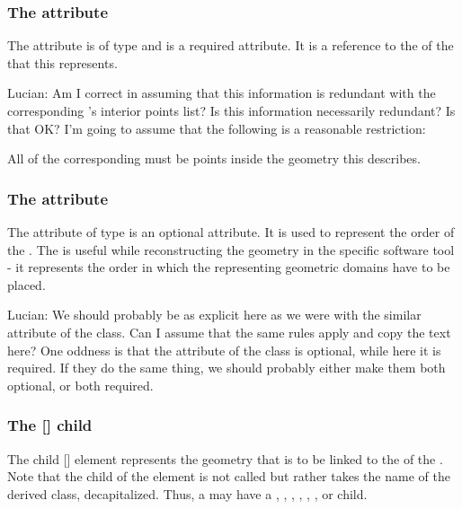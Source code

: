 \subsubsection{The  attribute}
The  attribute is of type  and is a required attribute. It is a reference to the  of the \Domain that this \CSGObject represents.

{\color{red} Lucian: \notice Am I correct in assuming that this information is redundant with the corresponding \Domain's interior points list?  Is this information necessarily redundant?  Is that OK?  I'm going to assume that the following is a reasonable restriction:}

All \InteriorPoints of the corresponding \Domain must be points inside the geometry this \CSGObject describes.

\subsubsection{The  attribute}
The  attribute of type  is an optional attribute. It is used to represent the order of the \CSGObject. The  is useful while reconstructing the geometry in the specific software tool - it represents the order in which the \CSGObjects representing geometric domains have to be placed.

{\color{red} Lucian: \notice We should probably be as explicit here as we were with the similar  attribute of the \AnalyticVolume class.  Can I assume that the same rules apply and copy the text here?  One oddness is that the  attribute of the \AnalyticVolume class is optional, while here it is required.  If they do the same thing, we should probably either make them both optional, or both required.}


\subsubsection{The [] child}

The child [] element represents the geometry that is to be linked to the  of the \CSGObject.  Note that the child of the \CSGObject element is not called  but rather takes the name of the derived class, decapitalized.  Thus, a \CSGObject may have a , , , , , , or  child.


